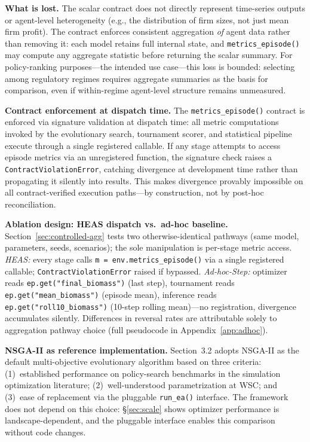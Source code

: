 \documentclass{wscpaperproc}
\begin{document}
\textbf{What is lost.} The scalar contract does not directly represent time-series
outputs or agent-level heterogeneity (e.g., the distribution of firm sizes, not
just mean firm profit). The contract enforces consistent aggregation \emph{of} agent data rather than removing it: each model retains full internal state, and \texttt{metrics\_episode()} may compute any aggregate statistic before returning the scalar summary. For policy-ranking purposes---the intended use case---this
loss is bounded: selecting among regulatory regimes requires aggregate summaries
as the basis for comparison, even if within-regime agent-level structure remains
unmeasured.

\textbf{Contract enforcement at dispatch time.} The \texttt{metrics\_episode()}
contract is enforced via signature validation at dispatch time: all metric
computations invoked by the evolutionary search, tournament scorer, and
statistical pipeline execute through a single registered callable. If any stage
attempts to access episode metrics via an unregistered function, the signature
check raises a \texttt{ContractViolationError}, catching divergence at development
time rather than propagating it silently into results. This makes divergence
provably impossible on all contract-verified execution paths---by construction,
not by post-hoc reconciliation.

\textbf{Ablation design: HEAS dispatch vs.\ ad-hoc baseline.}
\label{sec:ablation-design}
Section~\ref{sec:controlled-agg} tests two otherwise-identical pathways
(same model, parameters, seeds, scenarios); the sole manipulation is per-stage
metric access. \emph{HEAS:} every stage calls
\texttt{m = env.metrics\_episode()} via a single registered callable;
\texttt{ContractViolationError} raised if bypassed. \emph{Ad-hoc-Step:}
optimizer reads \texttt{ep.get("final\_biomass")} (last step), tournament reads
\texttt{ep.get("mean\_biomass")} (episode mean), inference reads
\texttt{ep.get("roll10\_biomass")} (10-step rolling mean)---no registration,
divergence accumulates silently. Differences in reversal rates are attributable
solely to aggregation pathway choice (full pseudocode in Appendix~\ref{app:adhoc}).

\textbf{NSGA-II as reference implementation.} Section~3.2 adopts NSGA-II as the
default multi-objective evolutionary algorithm based on three criteria:
(1)~established performance on policy-search benchmarks in the simulation
optimization literature; (2)~well-understood parametrization at WSC; and
(3)~ease of replacement via the pluggable \texttt{run\_ea()} interface. The
framework does not depend on this choice: \S\ref{sec:scale} shows optimizer performance is landscape-dependent, and the pluggable interface enables this comparison without code changes.
\end{document}
